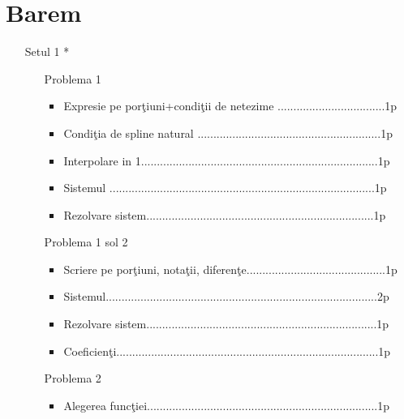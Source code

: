 \documentclass{article}%
\begin{document}
\section{Barem}

\begin{enumerate}
\item[Setul 1] *

\begin{enumerate}
\item[Problema 1] 

\begin{itemize}
\item Expresie pe por\c{t}iuni+condi\c{t}ii de netezime ..................................1p

\item Condi\c{t}ia de spline natural ..........................................................1p

\item Interpolare in 1...........................................................................1p

\item Sistemul ....................................................................................1p

\item Rezolvare sistem........................................................................1p
\end{itemize}

\item[Problema 1 sol 2] 

\begin{itemize}
\item Scriere pe por\c{t}iuni, nota\c{t}ii, diferen\c{t}e............................................1p

\item Sistemul......................................................................................2p

\item Rezolvare sistem.........................................................................1p

\item Coeficien\c{t}i...................................................................................1p
\end{itemize}

\item[Problema 2] 

\begin{itemize}
\item Alegerea func\c{t}iei.........................................................................1p


\end{itemize}
\end{enumerate}
\end{enumerate}
\end{document}
